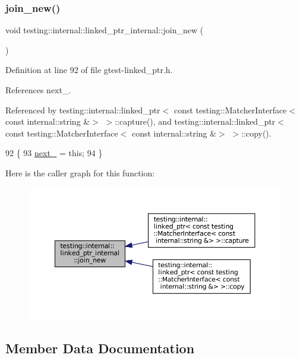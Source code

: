 \subsubsection{\texorpdfstring{join\+\_\+new()}{join\_new()}}
{\footnotesize\ttfamily void testing\+::internal\+::linked\+\_\+ptr\+\_\+internal\+::join\+\_\+new (\begin{DoxyParamCaption}{ }\end{DoxyParamCaption})\hspace{0.3cm}{\ttfamily [inline]}}



Definition at line 92 of file gtest-\/linked\+\_\+ptr.\+h.



References next\+\_\+.



Referenced by testing\+::internal\+::linked\+\_\+ptr$<$ const testing\+::\+Matcher\+Interface$<$ const internal\+::string \&$>$ $>$\+::capture(), and testing\+::internal\+::linked\+\_\+ptr$<$ const testing\+::\+Matcher\+Interface$<$ const internal\+::string \&$>$ $>$\+::copy().


\begin{DoxyCode}
92                   \{
93     \hyperlink{classtesting_1_1internal_1_1linked__ptr__internal_ae4397a65a4d76a24547fcf2cd17131d8}{next\_} = \textcolor{keyword}{this};
94   \}
\end{DoxyCode}
Here is the caller graph for this function\+:
\nopagebreak
\begin{figure}[H]
\begin{center}
\leavevmode
\includegraphics[width=350pt]{classtesting_1_1internal_1_1linked__ptr__internal_a742af1f65df2d5e2b7198a1b74264a83_icgraph}
\end{center}
\end{figure}


\subsection{Member Data Documentation}
\mbox{\label{classtesting_1_1internal_1_1linked__ptr__internal_ae4397a65a4d76a24547fcf2cd17131d8}} 
